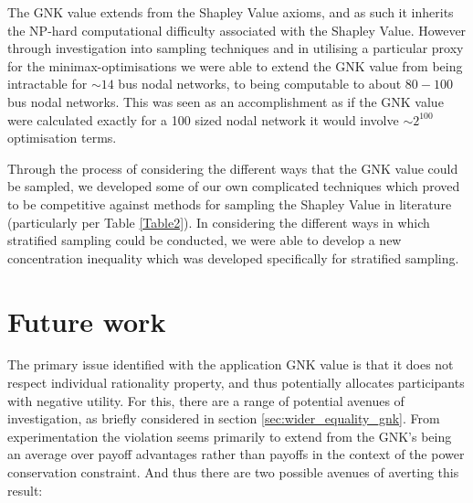 The GNK value extends from the Shapley Value axioms, and as such it inherits the NP-hard computational difficulty associated with the Shapley Value.
However through investigation into sampling techniques and in utilising a particular proxy for the minimax-optimisations we were able to extend the GNK value from being intractable for $\sim 14$ bus nodal networks, to being computable to about $80-100$ bus nodal networks.
This was seen as an accomplishment as if the GNK value were calculated exactly for a 100 sized nodal network it would involve $\sim 2^{100}$ optimisation terms.

Through the process of considering the different ways that the GNK value could be sampled, we developed some of our own complicated techniques which proved to be competitive against methods for sampling the Shapley Value in literature (particularly per Table \ref{Table2}).
In considering the different ways in which stratified sampling could be conducted, we were able to develop a new concentration inequality which was developed specifically for stratified sampling.




\section{Future work}
\label{sec:future}

The primary issue identified with the application GNK value is that it does not respect individual rationality property, and thus potentially allocates participants with negative utility. For this, there are a range of potential avenues of investigation, as briefly considered in section \ref{sec:wider_equality_gnk}.
From experimentation the violation seems primarily to extend from the GNK's being an average over payoff advantages rather than payoffs in the context of the power conservation constraint.
And thus there are two possible avenues of averting this result:

